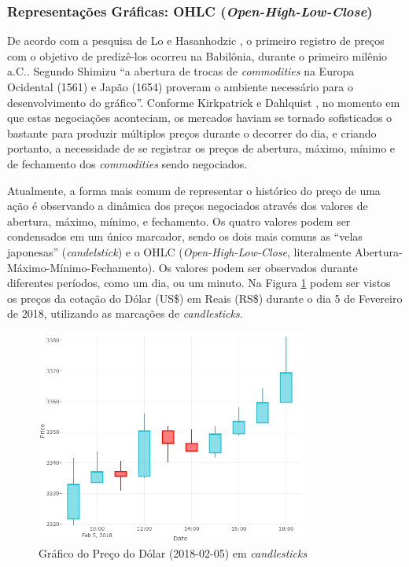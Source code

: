 \documentclass[12pt]{article}
\begin{document}
\subsubsection{Representações Gráficas: OHLC (\textit{Open-High-Low-Close})} \label{sec:OHLC}

De acordo com a pesquisa de Lo e Hasanhodzic \cite{LoHasanhodzic:2010}, o primeiro registro
de preços com o objetivo de predizê-los ocorreu na Babilônia, durante o primeiro milênio a.C..
Segundo Shimizu \cite{Shimizu:1986} ``a abertura de trocas de \textit{commodities} na
Europa Ocidental (1561) e Japão (1654) proveram o ambiente necessário para o desenvolvimento
do gráfico''. Conforme Kirkpatrick e Dahlquist \cite{KirkpatrickDahlquist:2006},
no momento em que estas negociações aconteciam, os mercados haviam se tornado sofisticados
o bastante para produzir múltiplos preços durante o decorrer do dia, e criando portanto,
a necessidade de se registrar os preços de abertura, máximo, mínimo e de fechamento dos
\textit{commodities} sendo negociados.

Atualmente, a forma mais comum de representar o histórico do preço de uma ação é observando
a dinâmica dos preços negociados através dos valores de abertura, máximo, mínimo, e fechamento.
Os quatro valores podem ser condensados em um único marcador, sendo os dois mais comuns as
``velas japonesas'' (\textit{candelstick}) e o OHLC (\textit{Open-High-Low-Close}, literalmente
Abertura-Máximo-Mínimo-Fechamento). Os valores podem ser observados durante diferentes períodos,
como um dia, ou um minuto. Na Figura \ref{fig:candlestick_chart} podem ser vistos os preços
da cotação do Dólar (US\$) em Reais (RS\$) durante o dia 5 de Fevereiro de 2018, utilizando
as marcações de \textit{candlesticks}.

\begin{figure}[H]
	\centering
	\includegraphics[width=0.8\textwidth]{candlestick_chart.png}
	\caption{Gráfico do Preço do Dólar (2018-02-05) em \textit{candlesticks}}
	\label{fig:candlestick_chart}
\end{figure}
\end{document}
